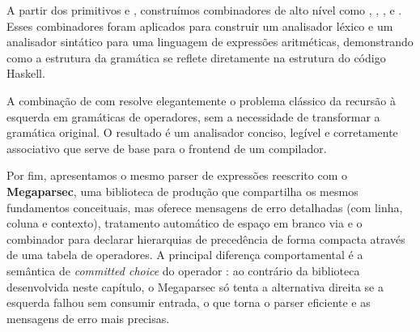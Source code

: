 A partir dos primitivos  e
, construímos combinadores de alto nível
como ,
, ,
 e .
Esses combinadores foram aplicados para construir um analisador
léxico e um analisador sintático para uma linguagem de expressões
aritméticas, demonstrando como a estrutura da gramática se reflete
diretamente na estrutura do código Haskell.

A combinação de  com
 resolve elegantemente o problema
clássico da recursão à esquerda em gramáticas de operadores, sem a
necessidade de transformar a gramática original. O resultado é um
analisador conciso, legível e corretamente associativo que serve de
base para o frontend de um compilador.

Por fim, apresentamos o mesmo parser de expressões reescrito com o
\textbf{Megaparsec}, uma biblioteca de produção que compartilha os
mesmos fundamentos conceituais, mas oferece mensagens de erro
detalhadas (com linha, coluna e contexto), tratamento automático de
espaço em branco via  e o combinador
 para declarar hierarquias de
precedência de forma compacta através de uma tabela de operadores. A
principal diferença comportamental é a semântica de \emph{committed
choice} do operador \haskell{<|>}: ao contrário da
biblioteca desenvolvida neste capítulo, o Megaparsec só tenta a
alternativa direita se a esquerda falhou sem consumir entrada, o que
torna o parser eficiente e as mensagens de erro mais precisas.

